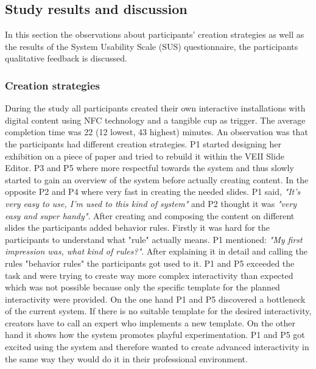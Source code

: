 \subsection{Study results and discussion}
In this section the observations about participants' creation strategies as well as the results of the System Usability Scale (SUS) questionnaire, the participants qualitative feedback is discussed.

\subsubsection{Creation strategies}
During the study all participants created their own interactive installations with digital content using NFC technology and a tangible cup as trigger. The average completion time was 22 (12 lowest, 43 highest) minutes. An observation was that the participants had different creation strategies. P1 started designing her exhibition on a piece of paper and tried to rebuild it within the VEII Slide Editor. P3 and P5 where more respectful towards the system and thus slowly started to gain an overview of the system before actually creating content. In the opposite P2 and P4 where very fast in creating the needed slides. P1 said, \textit{"It's very easy to use, I'm used to this kind of system"} and P2 thought it was \textit{"very easy and super handy"}. After creating and composing the content on different slides the participants added behavior rules. Firstly it was hard for the participants to understand what "rule" actually means. P1 mentioned: \textit{"My first impression was, what kind of rules?"}. After explaining it in detail and calling the rules "behavior rules" the participants got used to it. P1 and P5 exceeded the task and were trying to create way more complex interactivity than expected which was not possible because only the specific template for the planned interactivity were provided. On the one hand P1 and P5 discovered a bottleneck of the current system. If there is no suitable template for the desired interactivity, creators have to call an expert who implements a new template. On the other hand it shows how the system promotes playful experimentation. P1 and P5 got excited using the system and therefore wanted to create advanced interactivity in the same way they would do it in their professional environment.  
